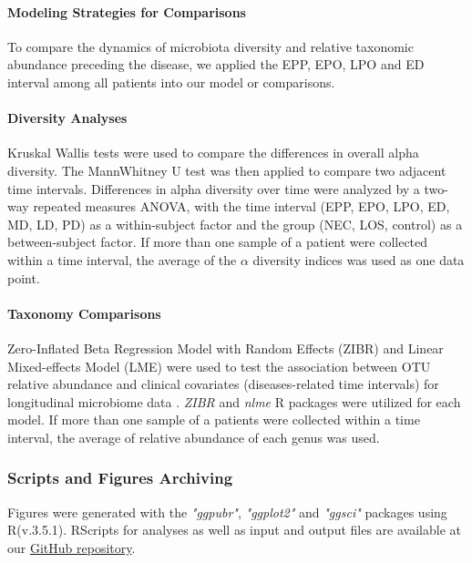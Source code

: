 \documentclass[fleqn,10pt]{wlpeerj} %
\begin{document}
      \paragraph*{Modeling Strategies for Comparisons}
      To compare the dynamics of microbiota diversity and relative taxonomic abundance preceding the disease, we applied the EPP, EPO, LPO and ED interval among all patients into our model or comparisons.

      \paragraph{Diversity Analyses}
      Kruskal Wallis tests were used to compare the differences in overall alpha diversity. The Mann\-Whitney U test was then applied to compare two adjacent time intervals. Differences in alpha diversity over time were analyzed by a two-way repeated measures ANOVA, with the time interval (EPP, EPO, LPO, ED, MD, LD, PD) as a within-subject factor and the group (NEC, LOS, control) as a between-subject factor.
      If more than one sample of a patient were collected within a time interval, the average of the $\alpha$  diversity indices was used as one data point.

      \paragraph*{Taxonomy Comparisons}
      Zero-Inflated Beta Regression Model with Random Effects (ZIBR) and Linear Mixed-effects Model (LME) were used to test the association between OTU relative abundance and clinical covariates (diseases-related time intervals) for longitudinal microbiome data \citep{chen2016two}. \textit{ZIBR} and \textit{nlme}\citep{nlme} R packages were utilized for each model.
      If more than one sample of a patients were collected within a time interval, the average of relative abundance of each genus was used.

    \subsubsection*{Scripts and Figures Archiving}
    Figures were generated with the \textit{"ggpubr"}\citep{kassambara2017ggpubr},  \textit{"ggplot2"}\citep{ggplot2} and \textit{"ggsci"}\citep{ggsci} packages using R(v.3.5.1).
    RScripts for analyses as well as input and output files are available at our \href{https://github.com/jiayiliujiayi/NEC-LOS-microbiota_pattern_comparison}{GitHub repository}.
\end{document}
